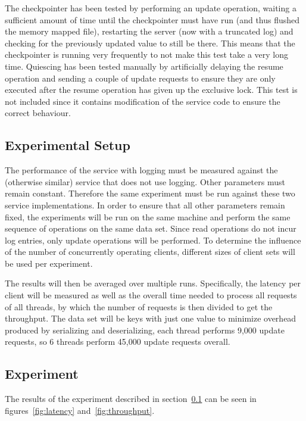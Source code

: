\documentclass[a4paper,11pt]{article}
\begin{document}
The checkpointer has been tested by performing an update operation, waiting a sufficient amount of time until the checkpointer must have run (and thus flushed the memory mapped file), restarting the server (now with a truncated log) and checking for the previously updated value to still be there. This means that the checkpointer is running very frequently to not make this test take a very long time. Quiescing has been tested manually by artificially delaying the resume operation and sending a couple of update requests to ensure they are only executed after the resume operation has given up the exclusive lock. This test is not included since it contains modification of the service code to ensure the correct behaviour.

\subsection{Experimental Setup}
\label{sec:pt3}
The performance of the service with logging must be measured against the (otherwise similar) service that does not use logging. Other parameters must remain constant. Therefore the same experiment must be run against these two service implementations. In order to ensure that all other parameters remain fixed, the experiments will be run on the same machine and perform the same sequence of operations on the same data set. Since read operations do not incur log entries, only update operations will be performed. To determine the influence of the number of concurrently operating clients, different sizes of client sets will be used per experiment.

The results will then be averaged over multiple runs. Specifically, the latency per client will be measured as well as the overall time needed to process all requests of all threads, by which the number of requests is then divided to get the throughput. The data set will be keys with just one value to minimize overhead produced by serializing and deserializing, each thread performs 9,000 update requests, so 6 threads perform 45,000 update requests overall.

\subsection{Experiment}
\label{sec:pt4}
The results of the experiment described in section~\ref{sec:pt3} can be seen in figures~\ref{fig:latency} and~\ref{fig:throughput}.
\end{document}
